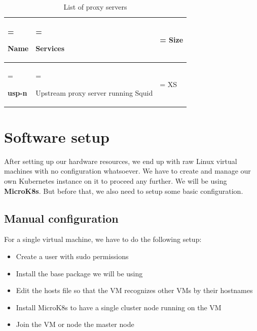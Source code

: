 \begin{table}[H]
    \renewcommand{\arraystretch}{1.5} %
    \caption{List of proxy servers}
    \centering
    \medskip
    \begin{tabularx}{1\textwidth} {
            | >{\hsize=1\hsize\linewidth=\hsize\raggedright\arraybackslash}X
            | >{\hsize=1.8\hsize\linewidth=\hsize\raggedright\arraybackslash}X
            | >{\hsize=0.2\hsize\linewidth=\hsize\centering\arraybackslash}X |}
        \hline
        \rowcolor{primary} \textbf{Name} & \textbf{Services}                   & \textbf{Size} \\
        \hline
        \textbf{usp-n}                   & Upstream proxy server running Squid & XS            \\
        \hline
    \end{tabularx}
\end{table}

\newpage
\section{Software setup}
After setting up our hardware resources, we end up with raw Linux virtual machines with no configuration whatsoever.
We have to create and manage our own Kubernetes instance on it to proceed any further.
We will be using {\bf MicroK8s}.
But before that, we also need to setup some basic configuration.

\subsection{Manual configuration}
For a single virtual machine, we have to do the following setup:

\begin{itemize}
    \item Create a user with sudo permissions
    \item Install the base package we will be using
    \item Edit the hosts file so that the VM recognizes other VMs by their hostnames
    \item Install MicroK8s to have a single cluster node running on the VM
    \item Join the VM or node the master node
\end{itemize}

